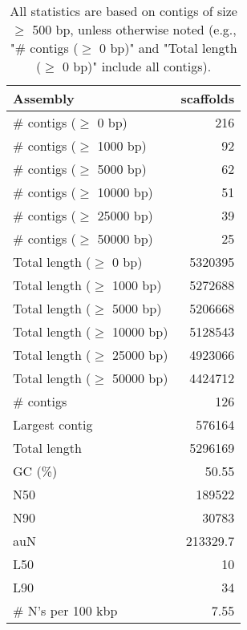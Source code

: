 \documentclass[12pt,a4paper]{article}
\begin{document}
\begin{table}[ht]
\begin{center}
\caption{All statistics are based on contigs of size $\geq$ 500 bp, unless otherwise noted (e.g., "\# contigs ($\geq$ 0 bp)" and "Total length ($\geq$ 0 bp)" include all contigs).}
\begin{tabular}{|l*{1}{|r}|}
\hline
Assembly & scaffolds \\ \hline
\# contigs ($\geq$ 0 bp) & 216 \\ \hline
\# contigs ($\geq$ 1000 bp) & 92 \\ \hline
\# contigs ($\geq$ 5000 bp) & 62 \\ \hline
\# contigs ($\geq$ 10000 bp) & 51 \\ \hline
\# contigs ($\geq$ 25000 bp) & 39 \\ \hline
\# contigs ($\geq$ 50000 bp) & 25 \\ \hline
Total length ($\geq$ 0 bp) & 5320395 \\ \hline
Total length ($\geq$ 1000 bp) & 5272688 \\ \hline
Total length ($\geq$ 5000 bp) & 5206668 \\ \hline
Total length ($\geq$ 10000 bp) & 5128543 \\ \hline
Total length ($\geq$ 25000 bp) & 4923066 \\ \hline
Total length ($\geq$ 50000 bp) & 4424712 \\ \hline
\# contigs & 126 \\ \hline
Largest contig & 576164 \\ \hline
Total length & 5296169 \\ \hline
GC (\%) & 50.55 \\ \hline
N50 & 189522 \\ \hline
N90 & 30783 \\ \hline
auN & 213329.7 \\ \hline
L50 & 10 \\ \hline
L90 & 34 \\ \hline
\# N's per 100 kbp & 7.55 \\ \hline
\end{tabular}
\end{center}
\end{table}
\end{document}
